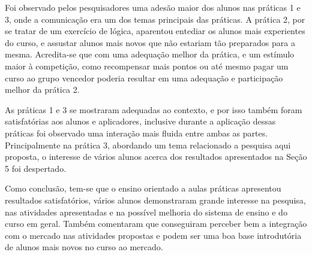 Foi observado pelos pesquisadores uma adesão maior dos alunos nas práticas 1 e 3, onde a comunicação era um dos temas principais das práticas. A prática 2, por se tratar de um exercício de lógica, aparentou entediar os alunos mais experientes do curso, e assustar alunos mais novos que não estariam tão preparados para a mesma. Acredita-se que com uma adequação melhor da prática, e um estímulo maior à competição, como recompensar mais pontos ou até mesmo pagar um curso ao grupo vencedor poderia resultar em uma adequação e participação melhor da prática 2.

As práticas 1 e 3 se mostraram adequadas ao contexto, e por isso também foram satisfatórias aos alunos e aplicadores, inclusive durante a aplicação dessas práticas foi observado uma interação mais fluida entre ambas as partes. Principalmente na prática 3, abordando um tema relacionado a pesquisa aqui proposta, o interesse de vários alunos acerca dos resultados apresentados na Seção 5 foi despertado.

Como conclusão, tem-se que o ensino orientado a aulas práticas apresentou resultados satisfatórios, vários alunos demonstraram grande interesse na pesquisa, nas atividades apresentadas e na possível melhoria do sistema de ensino e do curso em geral. Também comentaram que conseguiram perceber bem a integração com o mercado nas atividades propostas e podem ser uma boa base introdutória de alunos mais novos no curso ao mercado.